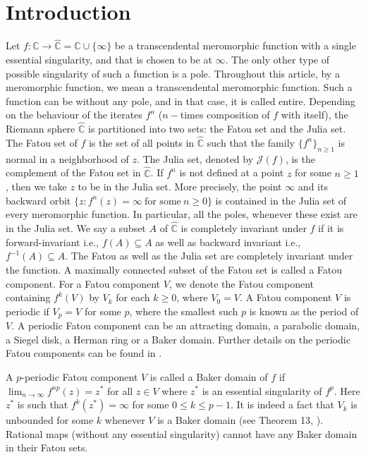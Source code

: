 \documentclass[11pt,a4paper]{article}
\begin{document}
	\section{Introduction}
	Let $f:\mathbb C\to \widehat{\mathbb C}=\mathbb C \cup\{\infty\}$ be a transcendental meromorphic function with a single essential singularity, and that is chosen to be at $\infty$. The only other type of possible singularity of such a function is a pole. Throughout this article, by a meromorphic function, we mean a transcendental meromorphic function. Such a function can be without any   pole, and in that case, it is called entire. 
Depending on the behaviour of the iterates $f^n$ ($n-$times composition of $f$ with itself), the Riemann sphere $\mathbb{{\widehat{C}}}$ is partitioned into two sets: the Fatou set and the Julia set. The Fatou set of $f$ is the set of all points in $\mathbb{{\widehat{C}}}$ such that the family $\{f^n\}_{n\geq 1}$ is normal in a neighborhood of $z$. The Julia set, denoted by $\mathcal{J}(f)$, is the complement of the Fatou set in $\widehat{\mathbb{C}}$. If $f^n$ is not defined at a point $z$ for some $n 
\geq 1$, then we take $z$ to be in the Julia set. More precisely, the point $\infty$ and its backward orbit $\{z: f^n (z) =\infty ~\mbox{for some}~n \geq 0 \}$ is contained in the Julia set of every  meromorphic function. In particular, all the poles, whenever these exist are in the Julia set. We say a subset $A$ of $\widehat{\mathbb{C}}$ is completely invariant under $f$ if it is forward-invariant  i.e., $f(A) \subseteq A$ as well as backward invariant i.e., $f^{-1} (A) \subseteq A$. The Fatou as well as the Julia set are completely invariant under the function. A maximally connected subset of the Fatou set is called a Fatou component. For a Fatou component $V$, we denote the Fatou component containing $f^k(V)$ by $V_k$ for each $k\geq 0$, where $V_0=V$. A Fatou component $V$ is periodic if $V_p =V$ for some $p$, where the smallest such $p$ is known as the period of $V$. A periodic Fatou component can be an attracting domain, a parabolic domain, a Siegel disk, a Herman ring or a Baker domain.  Further details on the periodic Fatou components can be found in \cite{Berg 1993}.
\par  A $p$-periodic Fatou component $V$ is called a Baker domain of $f$ if $\lim_{n \to \infty}f^{np} (z) = z^*$ for all $z \in V$ where $z^*$ is an essential singularity of $f^p$. Here $z^*$ is such that $f^k (z^*)=\infty$ for some $0 \leq k \leq p-1$. It is indeed a fact that $V_k$ is unbounded for some $k$ whenever $V$ is a Baker domain (see Theorem 13, \cite{Berg 1993}). Rational maps (without any essential singularity) cannot have any Baker domain in their Fatou sets. 
\end{document}
